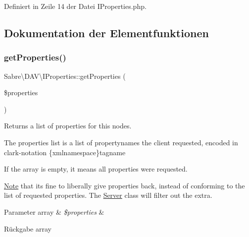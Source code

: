 Definiert in Zeile 14 der Datei I\+Properties.\+php.



\subsection{Dokumentation der Elementfunktionen}
\mbox{\label{interface_sabre_1_1_d_a_v_1_1_i_properties_a0d2fcaacf74daaa5cf24ea53a057140a}} 
\subsubsection{\texorpdfstring{get\+Properties()}{getProperties()}}
{\footnotesize\ttfamily Sabre\textbackslash{}\+D\+A\+V\textbackslash{}\+I\+Properties\+::get\+Properties (\begin{DoxyParamCaption}\item[{}]{\$properties }\end{DoxyParamCaption})}

Returns a list of properties for this nodes.

The properties list is a list of propertynames the client requested, encoded in clark-\/notation \{xmlnamespace\}tagname

If the array is empty, it means \textquotesingle{}all properties\textquotesingle{} were requested.

\mbox{\hyperlink{class_note}{Note}} that it\textquotesingle{}s fine to liberally give properties back, instead of conforming to the list of requested properties. The \mbox{\hyperlink{class_sabre_1_1_d_a_v_1_1_server}{Server}} class will filter out the extra.


\begin{DoxyParams}[1]{Parameter}
array & {\em \$properties} & \\
\hline
\end{DoxyParams}
\begin{DoxyReturn}{Rückgabe}
array 
\end{DoxyReturn}



